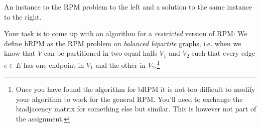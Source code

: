 \documentclass{tufte-handout}
\begin{document}
\begin{marginfigure}
\caption{ 
An instance to the RPM problem to the left and a solution to the same instance to the right.
}
\end{marginfigure}

Your task is to come up with an algorithm for a \emph{restricted} version of RPM: We define bRPM as the RPM problem on \emph{balanced bipartite} graphs, i.e. when we know that $V$ can be partitioned in two equal halfs $V_1$ and $V_2$ such that every edge $e\in E$ has one endpoint in $V_1$ and the other in $V_2$.\footnote{Once you
have found the algorithm for bRPM it is not too difficult to modify your algorithm to work for the general RPM. You'll need to exchange the biadjacency matrix for something else but similar. This is however not part of the assignment.}
\end{document}
